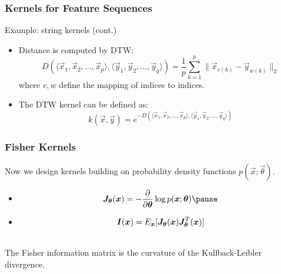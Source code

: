 \begin{frame}
	\frametitle{Kernels for Feature Sequences \cont}

	\begin{ovalblock}{Example: string kernels (cont.)}
		\begin{itemize}
			\item Distance is computed by DTW:
			      \begin{displaymath}
				      D( \langle \vec x_1, \vec x_2, \dots, \vec x_p\rangle,
				      \langle \vec y_1, \vec y_2, \dots, \vec y_q\rangle )
				      = \frac{1}{p}\sum_{k=1}^{p} \| \vec x_{v(k)}- \vec y_{w(k)} \|_2
			      \end{displaymath}
			      where $v, w$ define the mapping of indices to indices. \\[.5cm] \pause
			\item The DTW kernel can be defined as:
			      \begin{displaymath}
				      k(\vec x, \vec y) = e^{-D(
						      \langle \vec x_1, \vec x_2, \dots, \vec x_p\rangle,
						      \langle \vec y_1, \vec y_2, \dots, \vec y_q\rangle) }
			      \end{displaymath}
		\end{itemize}
	\end{ovalblock}
\end{frame}



\begin{frame}
	\frametitle{Fisher Kernels}

	Now we design kernels building on probability density functions $p(\vec x;\vec  \theta)$.

	\begin{itemize}
		\item {}
		      \begin{displaymath}
			      \mat J_{\vec \theta} (\vec x) =
			      -\frac{\partial}{\partial \vec \theta} \log p(\vec x; \vec \theta) \pause
		      \end{displaymath}
		\item {}
		      \begin{displaymath}
			      {\bm I} ({\bm x}) =
			      E_{{\bm x}} [{\bm J}_{{\bm \theta}}({\bm x}) {\bm J}_{{\bm \theta}}^T({\bm x})]
		      \end{displaymath}
	\end{itemize}
	\pspread

	 \\[.15cm]

	The Fisher information matrix is the curvature of the Kullback-Leibler divergence.
\end{frame}


